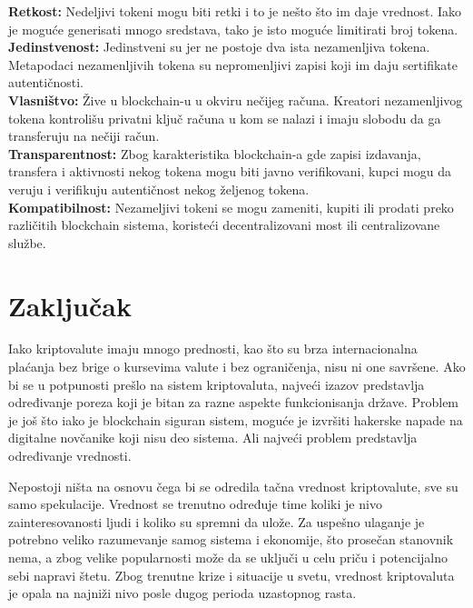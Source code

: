 \documentclass[a4paper]{article}
\begin{document}
{\textbf{Retkost:} Nedeljivi tokeni mogu biti retki i to je nešto što im daje vrednost. Iako je moguće generisati mnogo sredstava, tako je isto moguće limitirati broj tokena.\\

\textbf{Jedinstvenost:} Jedinstveni su jer ne postoje dva ista nezamenljiva tokena. Metapodaci nezamenljivih tokena su nepromenljivi zapisi koji im daju sertifikate autentičnosti.\\

\textbf{Vlasništvo:} Žive u blockchain-u u okviru nečijeg računa. Kreatori nezamenljivog tokena kontrolišu privatni ključ računa u kom se nalazi i imaju slobodu da ga transferuju na nečiji račun.\\

\textbf{Transparentnost:} Zbog karakteristika blockchain-a gde zapisi izdavanja, transfera i aktivnosti nekog tokena mogu biti javno verifikovani, kupci mogu da veruju i verifikuju autentičnost nekog željenog tokena.\\

\textbf{Kompatibilnost:} Nezameljivi tokeni se mogu zameniti, kupiti ili prodati preko različitih blockchain sistema, koristeći decentralizovani most ili centralizovane službe.


\newpage


\section{Zaključak}
\label{sec:zaključak}
Iako kriptovalute imaju mnogo prednosti, kao što su brza internacionalna plaćanja bez brige o kursevima valute i bez ograničenja, nisu ni one savršene. Ako bi se u potpunosti prešlo na sistem kriptovaluta, najveći izazov predstavlja određivanje poreza koji je bitan za razne aspekte funkcionisanja države. Problem je još što iako je blockchain siguran sistem, moguće je izvršiti hakerske napade na digitalne novčanike koji nisu deo sistema. Ali najveći problem predstavlja određivanje vrednosti.

Nepostoji ništa na osnovu čega bi se odredila tačna vrednost kriptovalute, sve su samo spekulacije. Vrednost se trenutno određuje time koliki je nivo zainteresovanosti ljudi i koliko su spremni da ulože. Za uspešno ulaganje je potrebno veliko razumevanje samog sistema i ekonomije, što prosečan stanovnik nema, a zbog velike popularnosti može da se uključi u celu priču i potencijalno sebi napravi štetu. Zbog trenutne krize i situacije u svetu, vrednost kriptovaluta je opala na najniži nivo posle dugog perioda uzastopnog rasta.

}
\end{document}
